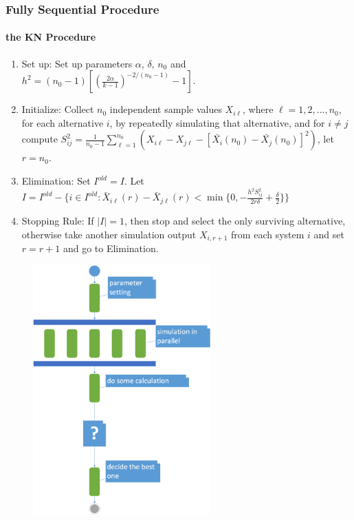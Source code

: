 \documentclass{beamer}
\begin{document}
\begin{frame}
\frametitle{Fully Sequential Procedure}
\framesubtitle{the KN Procedure}
\begin{enumerate}
\item{Set up: } Set up parameters $\alpha$, $\delta$, $n_0$ and $h^2 = (n_0 -1)[(\frac{2\alpha}{k - 1})^{-2/(n_0-1)} - 1]$.
\item{Initialize: } Collect $n_0$ independent sample values $X_{i\ell}$, where $\ell = 1, 2,...,n_0$, for each alternative $i$, by repeatedly simulating that alternative, and for $i \neq j$ compute $S_{ij}^2 = \frac{1}{n_0 - 1}\sum_{\ell=1}^{n_0}(X_{i\ell} - X_{j\ell} - [\bar{X_i}(n_0) - \bar{X_j}(n_0)]^2)$, let $r = n_0$.
\item{Elimination: } Set $I^{old} = I$. Let $I = I^{old} - \{i \in I^{old}: \bar{X}_{i\ell}(r) - \bar{X}_{j\ell}(r) < \min\{0, - \frac{h^2S_{ij}^2}{2r\delta} + \frac{\delta}{2} \} \}$
\item{Stopping Rule: } If $|I| = 1$, then stop and select the only surviving alternative, otherwise take another simulation output $X_{i,r+1}$ from each system $i$ and set $r = r + 1$ and go to Elimination.
\end{enumerate}
\end{frame}

\begin{frame}
\begin{figure}[ht]
\centering
\includegraphics[height=96mm]{kn_activity.png}
\end{figure}
\end{frame}
\end{document}
